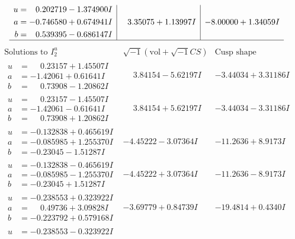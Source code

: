 \documentclass[1p]{elsarticle_modified}
\theoremstyle{definition}
\newcommand{\I}{\sqrt{-1}}
\begin{document}
$$\begin{array}{c|c|c}
\begin{aligned}
u &= \phantom{-}0.202719 - 1.374900 I \\
a &= -0.746580 + 0.674941 I \\
b &= \phantom{-}0.539395 - 0.686147 I\end{aligned}
 & \phantom{-}3.35075 + 1.13997 I & -8.00000 + 1.34059 I\\
 \hline 
 \end{array}$$\newpage$$\begin{array}{c|c|c}  
\text{Solutions to }I^u_{2}& \I (\text{vol} + \sqrt{-1}CS) & \text{Cusp shape}\\
 \hline 
\begin{aligned}
u &= \phantom{-}0.23157 + 1.45507 I \\
a &= -1.42061 + 0.61641 I \\
b &= \phantom{-}0.73908 - 1.20862 I\end{aligned}
 & \phantom{-}3.84154 - 5.62197 I & -3.44034 + 3.31186 I \\ \hline\begin{aligned}
u &= \phantom{-}0.23157 - 1.45507 I \\
a &= -1.42061 - 0.61641 I \\
b &= \phantom{-}0.73908 + 1.20862 I\end{aligned}
 & \phantom{-}3.84154 + 5.62197 I & -3.44034 - 3.31186 I \\ \hline\begin{aligned}
u &= -0.132838 + 0.465619 I \\
a &= -0.085985 + 1.255370 I \\
b &= -0.23045 - 1.51287 I\end{aligned}
 & -4.45222 - 3.07364 I & -11.2636 + 8.9173 I \\ \hline\begin{aligned}
u &= -0.132838 - 0.465619 I \\
a &= -0.085985 - 1.255370 I \\
b &= -0.23045 + 1.51287 I\end{aligned}
 & -4.45222 + 3.07364 I & -11.2636 - 8.9173 I \\ \hline\begin{aligned}
u &= -0.238553 + 0.323922 I \\
a &= \phantom{-}0.49736 + 3.09828 I \\
b &= -0.223792 + 0.579168 I\end{aligned}
 & -3.69779 + 0.84739 I & -19.4814 + 0.4340 I \\ \hline\begin{aligned}
u &= -0.238553 - 0.323922 I \\

\end{aligned}
\end{array}$$
\end{document}
